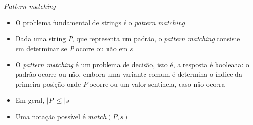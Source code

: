 \begin{frame}[fragile]{\textit{Pattern matching}}

    \begin{itemize}
        \item O problema fundamental de strings é o \textit{pattern matching}

        \item Dada uma string $P$, que representa um padrão, o \textit{pattern matching} consiste
            em determinar se $P$ ocorre ou não em $s$

        \item O \textit{pattern matching} é um problema de decisão, isto é, a resposta é booleana: 
            o padrão ocorre ou não, embora uma variante comum é determina o índice da primeira
            posição onde $P$ ocorre ou um valor sentinela, caso não ocorra

        \item Em geral, $|P| \leq |s|$

        \item Uma notação possível é $match(P, s)$

    \end{itemize}

\end{frame}
